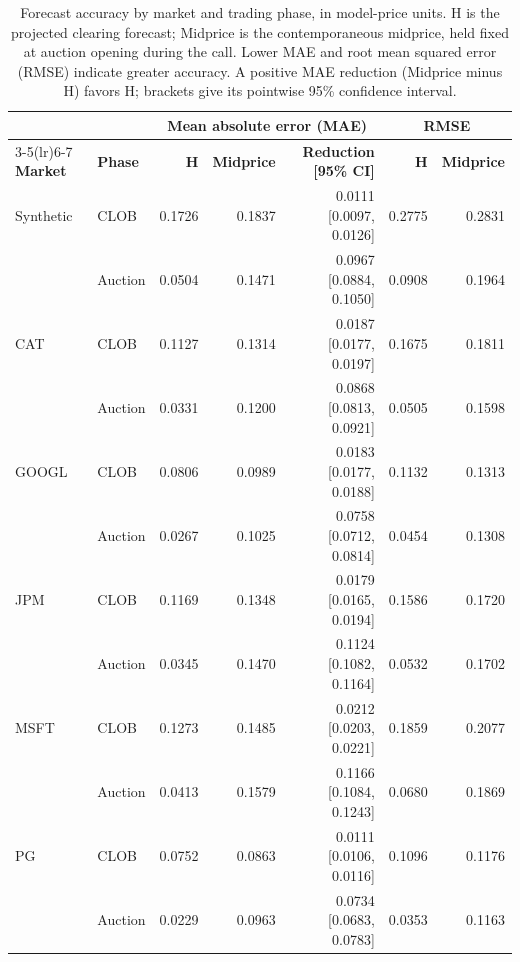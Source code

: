 \documentclass[11pt]{article}
\begin{document}
\begingroup
\begin{table}[ht!]

\centering
\setlength{\tabcolsep}{4pt}
\renewcommand{\arraystretch}{1.04}
\begin{tabular}{llrrrrr}
\toprule
& & \multicolumn{3}{c}{\textbf{Mean absolute error (MAE)}} & \multicolumn{2}{c}{\textbf{RMSE}} \\
\cmidrule(lr){3-5}\cmidrule(lr){6-7}
\textbf{Market} & \textbf{Phase} & \textbf{H} & \textbf{Midprice} & \textbf{Reduction [95\% CI]} & \textbf{H} & \textbf{Midprice} \\
\midrule
Synthetic & CLOB & 0.1726 & 0.1837 & 0.0111 [0.0097, 0.0126] & 0.2775 & 0.2831 \\
 & Auction & 0.0504 & 0.1471 & 0.0967 [0.0884, 0.1050] & 0.0908 & 0.1964 \\
\addlinespace[4pt]
CAT & CLOB & 0.1127 & 0.1314 & 0.0187 [0.0177, 0.0197] & 0.1675 & 0.1811 \\
 & Auction & 0.0331 & 0.1200 & 0.0868 [0.0813, 0.0921] & 0.0505 & 0.1598 \\
\addlinespace[4pt]
GOOGL & CLOB & 0.0806 & 0.0989 & 0.0183 [0.0177, 0.0188] & 0.1132 & 0.1313 \\
 & Auction & 0.0267 & 0.1025 & 0.0758 [0.0712, 0.0814] & 0.0454 & 0.1308 \\
\addlinespace[4pt]
JPM & CLOB & 0.1169 & 0.1348 & 0.0179 [0.0165, 0.0194] & 0.1586 & 0.1720 \\
 & Auction & 0.0345 & 0.1470 & 0.1124 [0.1082, 0.1164] & 0.0532 & 0.1702 \\
\addlinespace[4pt]
MSFT & CLOB & 0.1273 & 0.1485 & 0.0212 [0.0203, 0.0221] & 0.1859 & 0.2077 \\
 & Auction & 0.0413 & 0.1579 & 0.1166 [0.1084, 0.1243] & 0.0680 & 0.1869 \\
\addlinespace[4pt]
PG & CLOB & 0.0752 & 0.0863 & 0.0111 [0.0106, 0.0116] & 0.1096 & 0.1176 \\
 & Auction & 0.0229 & 0.0963 & 0.0734 [0.0683, 0.0783] & 0.0353 & 0.1163 \\
\bottomrule
\end{tabular}
\caption{Forecast accuracy by market and trading phase, in model-price units. H is the projected clearing forecast; Midprice is the contemporaneous midprice, held fixed at auction opening during the call. Lower MAE and root mean squared error (RMSE) indicate greater accuracy. A positive MAE reduction (Midprice minus H) favors H; brackets give its pointwise 95\% confidence interval.}
\label{tab:forecast_accuracy}
\end{table}
\end{document}

